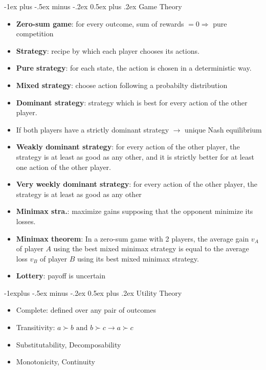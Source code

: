 \documentclass[10pt,a4paper,landscape]{article}
\makeatletter
\renewcommand{\section}{\@startsection{section}{1}{0mm}%
                                {-1ex plus -.5ex minus -.2ex}%
                                {0.5ex plus .2ex}%
                                {\normalfont\small\bfseries}}
\renewcommand{\subsection}{\@startsection{subsection}{2}{0mm}%
                                {-1explus -.5ex minus -.2ex}%
                                {0.5ex plus .2ex}%
                                {\normalfont\small\bfseries}}
\makeatother
\begin{document}
\begin{multicols*}{2}

\section{Game Theory}
\begin{itemize}
	\item \textbf{Zero-sum game}: for every outcome, sum of rewards $= 0 \Rightarrow$ pure competition
	\item \textbf{Strategy}: recipe by which each player chooses its actions.
	\item \textbf{Pure strategy}: for each state, the action is chosen in a deterministic way.
	\item \textbf{Mixed strategy}: choose action following a probabilty distribution
	\item \textbf{Dominant strategy}: strategy which is best for every action of the other player.
	\item If both players have a strictly dominant strategy $\rightarrow$ unique Nash equilibrium
	\item \textbf{Weakly dominant strategy}: for every action of the other player, the strategy is at least as good as any other, and it is strictly better for at least one action of the other player.
	\item \textbf{Very weekly dominant strategy}: for every action of the other player, the strategy is at least as good as any other
	\item \textbf{Minimax stra.}: maximize gains supposing that the opponent minimize its losses.
	\item \textbf{Minimax theorem}: In a zero-sum game with 2 players, the average gain $v_A$ of player $A$ using the best mixed minimax strategy is equal to the average loss $v_B$ of player $B$ using its best mixed minimax strategy.
	\item \textbf{Lottery}: payoff is uncertain
\end{itemize}

\subsection{Utility Theory}
\begin{itemize}
	\item Complete: defined over any pair of outcomes
	\item Transitivity: $a \succ b \text{ and } b \succ c \rightarrow a \succ c$
	\item Substitutability, Decomposability
	\item Monotonicity, Continuity
\end{itemize}


\end{multicols*}
\end{document}
